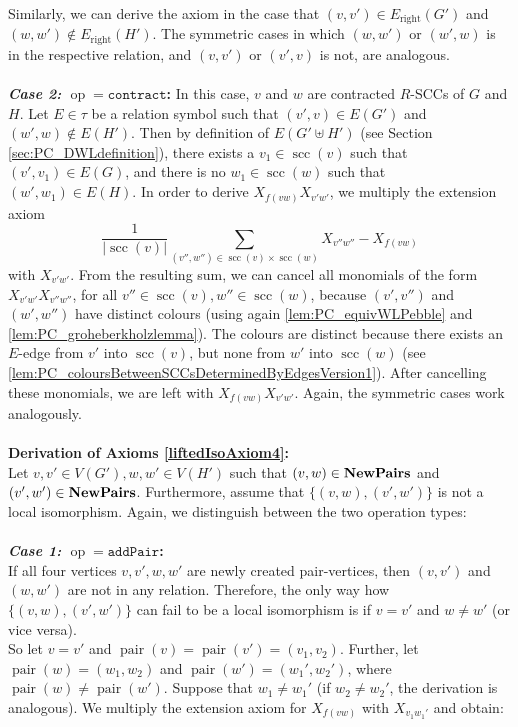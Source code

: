 \documentclass[10pt,a4paper]{article}
\newcommand{\Pairs}{\text{\upshape \textbf{NewPairs}}}
\newcommand{\pairOp }{\texttt{addPair}}
\newcommand{\sccOp }{\texttt{contract}}
\newcommand{\op}{\operatorname{op}}
\newcommand{\scc}{{\operatorname{scc}}}
\newcommand{\pair}{{\operatorname{pair}}}
\begin{document}
Similarly, we can derive the axiom in the case that $(v,v') \in  E_{\text{right}}(G')$ and $(w,w') \notin E_{\text{right}}(H')$. The symmetric cases in which $(w,w')$ or $(w',w)$ is in the respective relation, and $(v,v')$ or $(v',v)$ is not, are analogous.\\ 
\\
\textbf{\textit{Case 2:} $\op = \sccOp$:}
In this case, $v$ and $w$ are contracted $R$-SCCs of $G$ and $H$. Let $E \in \tau$ be a relation symbol such that $(v',v) \in E(G')$ and  $(w',w) \notin E(H')$. Then by definition of $E(G' \uplus H')$ (see Section \ref{sec:PC_DWLdefinition}), there exists a $v_1 \in \scc(v)$ such that $(v',v_1) \in E(G)$, and there is no $w_1 \in \scc(w)$ such that $(w',w_1) \in E(H)$.
In order to derive $X_{f(vw)}X_{v'w'}$, we multiply the extension axiom
\[
\frac{1}{|\scc(v)|}\sum\limits_{(v'',w'')\in \scc(v) \times \scc(w)} X_{v'' w''} - X_{f(vw)}
\]
with $X_{v'w'}$. From the resulting sum, we can cancel all monomials of the form $X_{v'w'}X_{v''w''}$, for all $v'' \in \scc(v), w'' \in \scc(w)$, because $(v', v'')$ and $(w',w'')$ have distinct colours (using again \autoref{lem:PC_equivWLPebble} and \autoref{lem:PC_groheberkholzlemma}). The colours are distinct because there exists an $E$-edge from $v'$ into $\scc(v)$, but none from $w'$ into $\scc(w)$ (see \autoref{lem:PC_coloursBetweenSCCsDeterminedByEdgesVersion1}). After cancelling these monomials, we are left with $X_{f(vw)}X_{v'w'}$.
Again, the symmetric cases work analogously.\\
\\
\textbf{Derivation of Axioms \eqref{liftedIsoAxiom4}:}\\ 
Let $v,v' \in V(G'), w,w' \in V(H')$ such that $(v,w) \in \Pairs$ and  $(v',w') \in \Pairs$. Furthermore, assume that $\{(v,w),(v',w')\}$ is not a local isomorphism. Again, we distinguish between the two operation types:\\
\\
\textbf{\textit{Case 1:} $\op = \pairOp $:}\\
If all four vertices $v,v',w,w'$ are newly created pair-vertices, then $(v,v')$ and $(w,w')$ are not in any relation. Therefore, the only way how $\{(v,w),(v',w')\}$ can fail to be a local isomorphism is if $v = v'$ and $w \neq w'$ (or vice versa).\\
So let $v = v'$ and $\pair(v) = \pair(v') = (v_1,v_2)$. Further, let $\pair(w) = (w_1,w_2)$ and $\pair(w') = (w_1',w_2')$, where $\pair(w) \neq \pair(w')$. Suppose that $w_1 \neq w_1'$ (if $w_2 \neq w_2'$, the derivation is analogous). We multiply the extension axiom for $X_{f(vw)}$ with $X_{v_1w_1'}$ and obtain:
\end{document}
